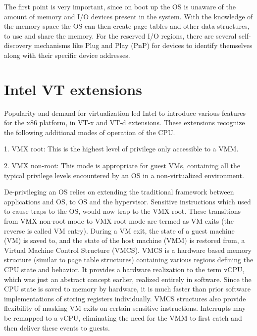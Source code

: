 The first point is very important, since  on boot up the OS is unaware of the amount of memory and I/O devices present in the system. With the knowledge of the memory space the OS can then create page tables and other data structures, to use and share the memory. For the reserved I/O regions, there are several self-discovery mechanisms like Plug and Play (PnP) for devices to identify themselves along with their specific device addresses. 

\section{Intel VT extensions}
Popularity and demand for virtualization led Intel to introduce various features for the x86 platform, in VT-x and VT-d extensions. These extensions recognize the following additional modes of operation of the CPU. 

1. VMX root: This is the highest level of privilege only accessible to a VMM. 

2. VMX non-root: This mode is appropriate for guest VMs, containing all the typical privilege levels encountered by an OS in a non-virtualized environment. 

De-privileging an OS relies on extending the traditional framework between applications and OS, to OS and the hypervisor. Sensitive instructions which used to cause traps to the OS, would now trap to the VMX root. These transitions from VMX non-root mode to VMX root mode are termed as VM exits (the reverse is called VM entry). During a VM exit, the state of a guest machine (VM) is saved to, and the state of the host machine (VMM) is restored from, a Virtual Machine Control Structure (VMCS). VMCS is a hardware based memory structure (similar to page table structures) containing various regions defining the CPU state and behavior. It provides a hardware realization to the term vCPU, which was just an abstract concept earlier, realized entirely in software. Since the CPU state is saved to memory by hardware, it is much faster than prior software implementations of storing registers individually. VMCS structures also provide flexibility of masking VM exits on certain sensitive instructions. Interrupts may be remapped to a vCPU, eliminating the need for the VMM to first catch and then deliver these events to guests. 

